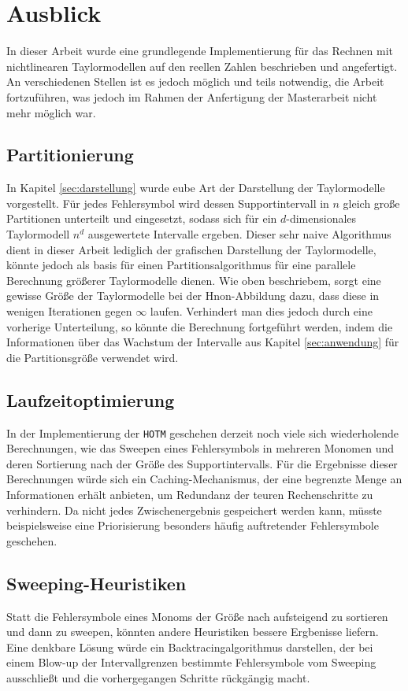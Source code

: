 \section{Ausblick}
In dieser Arbeit wurde eine grundlegende Implementierung für das Rechnen mit nichtlinearen Taylormodellen auf den reellen Zahlen beschrieben und angefertigt. An verschiedenen Stellen ist es jedoch möglich und teils notwendig, die Arbeit fortzuführen, was jedoch im Rahmen der Anfertigung der Masterarbeit nicht mehr möglich war.

\subsection*{Partitionierung}
In Kapitel \ref{sec:darstellung} wurde eube Art der Darstellung der Taylormodelle vorgestellt. Für jedes Fehlersymbol wird dessen Supportintervall in $n$ gleich große Partitionen unterteilt und eingesetzt, sodass sich für ein $d$-dimensionales Taylormodell $n^d$ ausgewertete Intervalle ergeben. Dieser sehr naive Algorithmus dient in dieser Arbeit lediglich der grafischen Darstellung der Taylormodelle, könnte jedoch als basis für einen Partitionsalgorithmus für eine parallele Berechnung größerer Taylormodelle dienen. Wie oben beschriebem, sorgt eine gewisse Größe der Taylormodelle bei der H\e non-Abbildung dazu, dass diese in wenigen Iterationen gegen $\infty$ laufen. Verhindert man dies jedoch durch eine vorherige Unterteilung, so könnte die Berechnung fortgeführt werden, indem die Informationen über das Wachstum der Intervalle aus Kapitel \ref{sec:anwendung} für die Partitionsgröße verwendet wird.


\subsection*{Laufzeitoptimierung} 
In der Implementierung der \verb+HOTM+ geschehen derzeit noch viele sich wiederholende Berechnungen, wie das Sweepen eines Fehlersymbols in mehreren Monomen und deren Sortierung nach der Größe des Supportintervalls. Für die Ergebnisse dieser Berechnungen würde sich ein Caching-Mechanismus, der eine begrenzte Menge an Informationen erhält anbieten, um Redundanz der teuren Rechenschritte zu verhindern. Da nicht jedes Zwischenergebnis gespeichert werden kann, müsste beispielsweise eine Priorisierung besonders häufig auftretender Fehlersymbole geschehen.


\subsection*{Sweeping-Heuristiken}
Statt die Fehlersymbole eines Monoms der Größe nach aufsteigend zu sortieren und dann zu sweepen, könnten andere Heuristiken bessere Ergbenisse liefern. Eine denkbare Lösung würde ein Backtracingalgorithmus darstellen, der bei einem Blow-up der Intervallgrenzen bestimmte Fehlersymbole vom Sweeping ausschließt und die vorhergegangen Schritte rückgängig macht.


